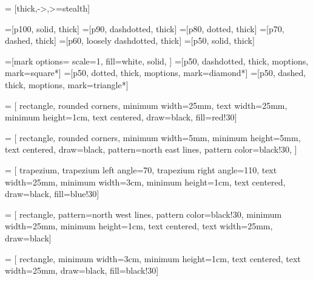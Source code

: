 \tikzset{external/force remake}
  \tikzexternalize[prefix=External/]

\tikzset{>=latex}
 = [thick,->,>=stealth]


=[p100, solid, thick]
=[p90, dashdotted, thick]
=[p80, dotted, thick]
=[p70, dashed, thick]
=[p60, loosely dashdotted, thick]
=[p50, solid, thick]

=[mark options={
  scale=1,
  fill=white,
  solid,
  }]
=[p50, dashdotted, thick, moptions, mark=square*]
=[p50, dotted, thick, moptions, mark=diamond*]
=[p50, dashed, thick, moptions, mark=triangle*]

 = [
  rectangle,
  rounded corners,
  minimum width=25mm,
  text width=25mm,
  minimum height=1cm,
  text centered,
  draw=black,
  fill=red!30]

 = [
  rectangle,
  rounded corners,
  minimum width=5mm,
  minimum height=5mm,
  text centered,
  draw=black,
  pattern=north east lines,
  pattern color=black!30,
  ]

 = [
  trapezium,
  trapezium left angle=70,
  trapezium right angle=110,
  text width=25mm,
  minimum width=3cm,
  minimum height=1cm,
  text centered,
  draw=black,
  fill=blue!30]

 = [
  rectangle,
  pattern=north west lines,
  pattern color=black!30,
  minimum width=25mm,
  minimum height=1cm,
  text centered,
  text width=25mm,
  draw=black]

 = [
  rectangle,
  minimum width=3cm,
  minimum height=1cm,
  text centered,
  text width=25mm,
  draw=black,
  fill=black!30]





